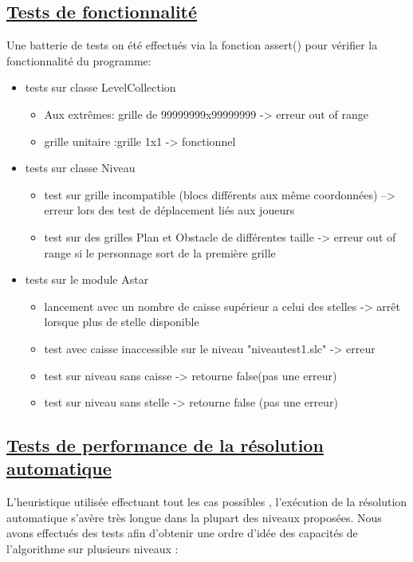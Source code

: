 \documentclass{article}
\begin{document}
\begin{center}
\section{\underline{Tests de fonctionnalité}}
\end{center}
	\vspace{2cm}
	Une batterie de tests on été effectués via la fonction assert() pour vérifier la fonctionnalité du programme:
\vspace{1cm}
	\begin{itemize}

	\item tests sur classe LevelCollection
		\begin{itemize}
		\item Aux extrêmes: grille de 99999999x99999999 -> erreur out of range
		\item grille unitaire :grille 1x1 -> fonctionnel
		\end{itemize}
		\vspace{0.5cm}
	\item tests sur classe Niveau
		\begin{itemize}
		\item test sur grille incompatible (blocs différents aux même coordonnées) --> erreur lors des test de déplacement liés aux joueurs
		\item test sur des grilles Plan et Obstacle de différentes taille -> erreur out of range si le personnage sort de la première grille
		\end{itemize}
		\vspace{0.5cm}
	\item tests sur le module Astar
		\begin{itemize}
		\item lancement avec un nombre de caisse supérieur a celui des stelles  -> arrêt lorsque plus de stelle disponible
		\item test avec caisse inaccessible sur le niveau "niveautest1.slc" -> erreur
		\item test sur niveau sans caisse -> retourne false(pas une erreur)
		\item test sur niveau sans stelle -> retourne false (pas une erreur) 
		\end{itemize}
	\end{itemize}
\newpage
	
	\begin{center}

	\section{\underline{Tests de performance de la résolution automatique}}
	\vspace{1 cm}
	L'heuristique utilisée effectuant tout les cas possibles , l'exécution de la résolution automatique s'avère très longue dans la plupart des niveaux proposées. Nous avons effectués des tests afin d'obtenir une ordre d'idée des capacités de l'algorithme sur plusieurs niveaux :
	\end{center}
	\vspace{2 cm}
	
\end{document}
